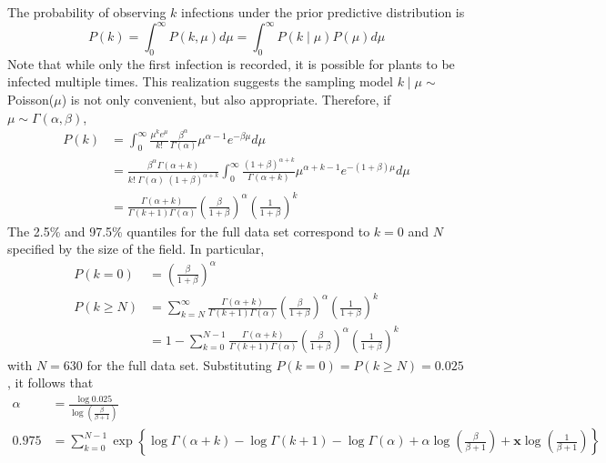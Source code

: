 \documentclass{uwstat572}
\begin{document}
The probability of observing $k$ infections under the prior predictive distribution is
$$ P(k) = \int_0^{\infty} P(k, \mu) d\mu = \int_0^{\infty} P(k \mid \mu)  P(\mu) d\mu $$
Note that while only the first infection is recorded, it is possible for plants to be infected multiple times. 
This realization suggests the sampling model $k \mid \mu \sim$ Poisson($\mu$) is not only convenient, but also appropriate. 
Therefore, if $\mu \sim \Gamma(\alpha, \beta)$,
\begin{align*}
P(k) &= \int_0^{\infty} \frac{\mu^k e^{\mu}}{k!}  \frac{\beta^{\alpha}}{\Gamma(\alpha)} \mu^{\alpha - 1} e^{-\beta \mu}d\mu \\
	&= \frac{\beta^{\alpha} \Gamma(\alpha+k)}{k! \; \Gamma(\alpha) \; (1+\beta)^{\alpha+k}}  \int_0^{\infty} \frac{(1+\beta)^{\alpha+k}}{\Gamma(\alpha+k)} \mu^{\alpha + k - 1} e^{-(1+\beta)\mu}d\mu \\
	&= \frac{\Gamma(\alpha+k)}{\Gamma(k+1) \Gamma(\alpha)} \left( \frac{\beta}{1+\beta} \right)^{\alpha} \left( \frac{1}{1+\beta} \right)^k
\end{align*}
The 2.5\% and 97.5\% quantiles for the full data set correspond to $k=0$ and $N$ specified by the size of the field. In particular, 
\begin{align*}
P(k=0) &= \left( \frac{\beta}{1+\beta} \right)^{\alpha} \\
P(k \ge N) &= \sum_{k=N}^{\infty} \frac{\Gamma(\alpha+k)}{\Gamma(k+1) \Gamma(\alpha)} \left( \frac{\beta}{1+\beta} \right)^{\alpha} \left( \frac{1}{1+\beta} \right)^k \\
	&=1 - \sum_{k=0}^{N-1} \frac{\Gamma(\alpha+k)}{\Gamma(k+1) \Gamma(\alpha)} \left( \frac{\beta}{1+\beta} \right)^{\alpha} \left( \frac{1}{1+\beta} \right)^k 
\end{align*}
with $N=630$ for the full data set. 
Substituting $P(k=0)=P(k \ge N)=0.025$, it follows that 
\begin{align*}
\alpha &= \frac{\log 0.025}{\log \left( \frac{\beta}{\beta+1} \right)} \\
0.975 &= \sum_{k=0}^{N-1} \exp \left\{ \log \Gamma(\alpha+k) - \log \Gamma(k+1) - \log \Gamma(\alpha) + \alpha \log \left(\frac{\beta}{\beta +1} \right) + \boldsymbol{x} \log \left(\frac{1}{\beta +1} \right) \right\}
\end{align*}
\end{document}
